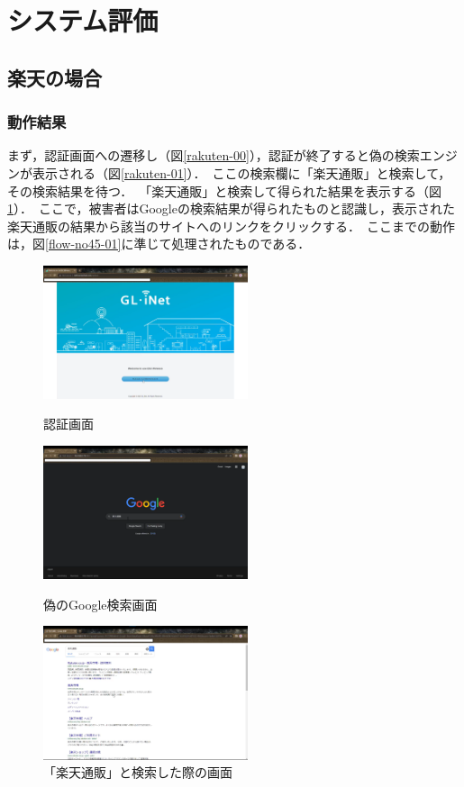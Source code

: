 \documentclass[dvipdfmx,twocolumn]{jsarticle}
\begin{document}
    \section{システム評価}
        \subsection{楽天の場合}
            \subsubsection{動作結果}
                まず，認証画面への遷移し（図\ref{rakuten-00}），認証が終了すると偽の検索エンジンが表示される（図\ref{rakuten-01}）．\
                ここの検索欄に「楽天通販」と検索して，その検索結果を待つ．\
                「楽天通販」と検索して得られた結果を表示する（図\ref{rakuten-02}）．\
                ここで，被害者はGoogleの検索結果が得られたものと認識し，表示された楽天通販の結果から該当のサイトへのリンクをクリックする．\
                ここまでの動作は，図\ref{flow-no45-01}に準じて処理されたものである．\
                \begin{figure}[h]
                    \centering
                    \includegraphics[width=6cm]{img/rakuten/rakuten-00.png}
                    \caption{認証画面}
                    \label{rakuten-00}
                    \includegraphics[width=6cm]{img/rakuten/rakuten-01.png}
                    \caption{偽のGoogle検索画面}
                    \label{rakuten-01}
                    \includegraphics[width=6cm]{img/rakuten/rakuten-02.png}
                    \caption{「楽天通販」と検索した際の画面}
                    \label{rakuten-02}
                \end{figure}
\end{document}
